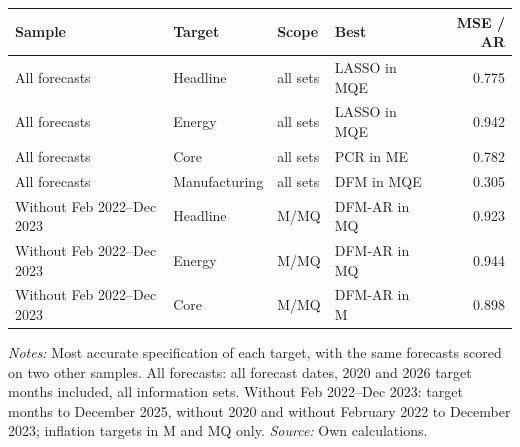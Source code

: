 \begin{threeparttable}
\begin{tabular}{llllr}
\toprule
Sample & Target & Scope & Best & MSE / AR \\
\midrule
All forecasts & Headline & all sets & LASSO in MQE & 0.775 \\
All forecasts & Energy & all sets & LASSO in MQE & 0.942 \\
All forecasts & Core & all sets & PCR in ME & 0.782 \\
All forecasts & Manufacturing & all sets & DFM in MQE & 0.305 \\
Without Feb 2022--Dec 2023 & Headline & M/MQ & DFM-AR in MQ & 0.923 \\
Without Feb 2022--Dec 2023 & Energy & M/MQ & DFM-AR in MQ & 0.944 \\
Without Feb 2022--Dec 2023 & Core & M/MQ & DFM-AR in M & 0.898 \\
\bottomrule
\end{tabular}
\begin{tablenotes}[flushleft]\footnotesize
\item \textit{Notes:} Most accurate specification of each target, with the same forecasts scored on two other samples. All forecasts: all \PaperOrigins{} forecast dates, 2020 and 2026 target months included, all information sets. Without Feb 2022--Dec 2023: target months to December 2025, without 2020 and without February 2022 to December 2023; inflation targets in M and MQ only. \textit{Source:} Own calculations.
\end{tablenotes}
\end{threeparttable}
